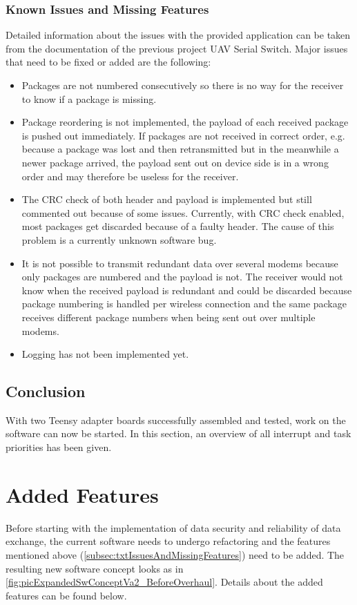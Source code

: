 \subsubsection{Known Issues and Missing Features} \label{subsec:txtIssuesAndMissingFeatures}
Detailed information about the issues with the provided application can be taken from the documentation of the previous project UAV Serial Switch. Major issues that need to be fixed or added are the following: \begin{itemize}
    \item Packages are not numbered consecutively so there is no way for the receiver to know if a package is missing.
    \item Package reordering is not implemented, the payload of each received package is pushed out immediately. If packages are not received in correct order, e.g. because a package was lost and then retransmitted but in the meanwhile a newer package arrived, the payload sent out on device side is in a wrong order and may therefore be useless for the receiver.
    \item The CRC check of both header and payload is implemented but still commented out because of some issues. Currently, with CRC check enabled, most packages get discarded because of a faulty header. The cause of this problem is a currently unknown software bug.
    \item It is not possible to transmit redundant data over several modems because only packages are numbered and the payload is not. The receiver would not know when the received payload is redundant and could be discarded because package numbering is handled per wireless connection and the same package receives different package numbers when being sent out over multiple modems.
    \item Logging has not been implemented yet.
\end{itemize}
%
\subsection{Conclusion}
With two Teensy adapter boards successfully assembled and tested, work on the software can now be started. In this section, an overview of all interrupt and task priorities has been given.
%
%
%
%
%
%
%
%
%
\section{Added Features} \label{sec:txtAddedFeatures}
Before starting with the implementation of data security and reliability of data exchange, the current software needs to undergo refactoring and the features mentioned above (\autoref{subsec:txtIssuesAndMissingFeatures}) need to be added. The resulting new software concept looks as in \autoref{fig:picExpandedSwConceptVa2_BeforeOverhaul}. Details about the added features can be found below.
%
%
